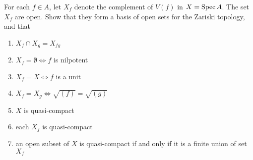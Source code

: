 \begin{problem}
	For each $f \in A$, let $X_f$ denote the complement of $V(f)$ in $X = \operatorname{Spec} A$. The set $X_f$ are open. Show that they form a basis of open sets for the Zariski topology, and that
	\begin{enumerate}
		\item $X_f \cap X_g = X_{fg}$
		\item $X_f = \emptyset \iff f$ is nilpotent
		\item $X_f = X \iff f$ is a unit
		\item $X_f = X_g \iff \sqrt{(f)} = \sqrt{(g)}$
		\item $X$ is quasi-compact
		\item each $X_f$ is quasi-compact
		\item an open subset of $X$ is quasi-compact if and only if it is a finite union of set $X_f$
	\end{enumerate}
\end{problem}

